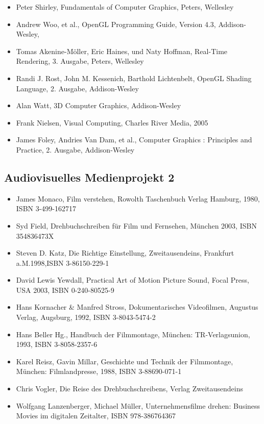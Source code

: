 \begin{itemize}
\tightlist
\item
  Peter Shirley, Fundamentals of Computer Graphics, Peters, Wellesley
\item
  Andrew Woo, et al., OpenGL Programming Guide, Version 4.3,
  Addison-Wesley,
\item
  Tomas Akenine-Möller, Eric Haines, und Naty Hoffman, Real-Time
  Rendering, 3. Ausgabe, Peters, Wellesley
\item
  Randi J. Rost, John M. Kessenich, Barthold Lichtenbelt, OpenGL Shading
  Language, 2. Ausgabe, Addison-Wesley
\item
  Alan Watt, 3D Computer Graphics, Addison-Wesley
\item
  Frank Nielsen, Visual Computing, Charles River Media, 2005
\item
  James Foley, Andries Van Dam, et al., Computer Graphics : Principles
  and Practice, 2. Ausgabe, Addison-Wesley
\end{itemize}

\subsection*{Audiovisuelles Medienprojekt
2\label{/mi-2017/modulbeschreibungen-bachelor/BA_Vertiefung-Visual-Computing}}\label{audiovisuelles-medienprojekt-2pathlabelmi-2017modulbeschreibungen-bachelorbaux5fvertiefung-visual-computing-4}

\begin{itemize}
\tightlist
\item
  James Monaco, Film verstehen, Rowolth Taschenbuch Verlag Hamburg,
  1980, ISBN 3-499-162717
\item
  Syd Field, Drehbuchschreiben für Film und Fernsehen, München 2003,
  ISBN 354836473X
\item
  Steven D. Katz, Die Richtige Einstellung, Zweitausendeins, Frankfurt
  a.M.1998,ISBN 3-86150-229-1
\item
  David Lewis Yewdall, Practical Art of Motion Picture Sound, Focal
  Press, USA 2003, ISBN 0-240-80525-9
\item
  Hans Kornacher \& Manfred Stross, Dokumentarisches Videofilmen,
  Augustus Verlag, Augsburg, 1992, ISBN 3-8043-5474-2
\item
  Hans Beller Hg., Handbuch der Filmmontage, München: TR-Verlagsunion,
  1993, ISBN 3-8058-2357-6
\item
  Karel Reisz, Gavin Millar, Geschichte und Technik der Filmmontage,
  München: Filmlandpresse, 1988, ISBN 3-88690-071-1
\item
  Chris Vogler, Die Reise des Drehbuchschreibens, Verlag Zweitausendeins
\item
  Wolfgang Lanzenberger, Michael Müller, Unternehmensfilme drehen:
  Business Movies im digitalen Zeitalter, ISBN 978-386764367
\end{itemize}

